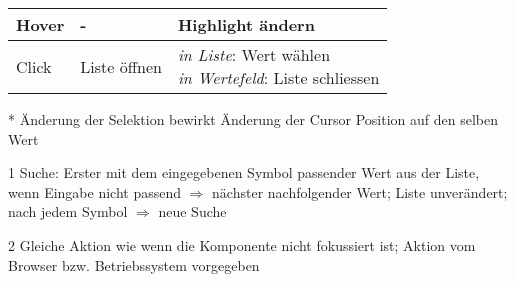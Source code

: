 \begin{table}[!htb]
\begin{adjustbox}{max width=\textwidth}
\begin{threeparttable}
\begin{tabular}{ l || l | l }
                \hline
                Hover      & -                & Highlight ändern \\
                \hline
                Click      & Liste öffnen     & \tbbr{\emph{in Liste}: Wert wählen \\
                                                      \emph{in Wertefeld}: Liste schliessen} \\
                \hline
            \end{tabular}
            \begin{tablenotes}
                \scriptsize
                \item[*] Änderung der Selektion bewirkt Änderung der Cursor Position auf den selben Wert
                \item
                \item[1] Suche: Erster mit dem eingegebenen Symbol passender Wert aus der Liste, wenn Eingabe nicht passend $\Rightarrow$ nächster nachfolgender Wert; 
                                Liste unverändert; nach jedem Symbol $\Rightarrow$ neue Suche
                \item[2] Gleiche Aktion wie wenn die Komponente nicht fokussiert ist; Aktion vom Browser bzw. Betriebssystem vorgegeben
            \end{tablenotes}
        \end{threeparttable}
    \end{adjustbox}
\end{table}
